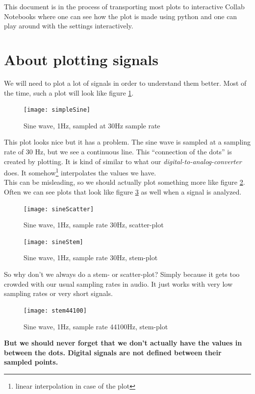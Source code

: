 This document is in the process of transporting most plots to interactive Collab Notebooks  where one can see how the plot is made using python and one can play around with the settings interactively.

\section{About plotting signals}

We will need to plot a lot of signals in order to understand them better. Most of the time, such a plot will look like figure \ref{fig:simpeSine}.

\begin{figure}[h!]
	\centering
	\texttt{[image: simpleSine]}
	\caption[simple sine plot]
	{Sine wave, 1Hz, sampled at 30Hz sample rate}
	\label{fig:simpeSine}
\end{figure}

This plot looks nice but it has a problem. The sine wave is sampled at a sampling rate of 30 Hz, but we see a continuous line. This ``connection of the dots'' is created by plotting. It is kind of similar to what our \textit{digital-to-analog-converter} does. It somehow\footnote{linear interpolation in case of the plot} interpolates the values we have. \\
This can be misleading, so we should actually plot something more like figure \ref{fig:scatter}. Often we can see plots that look like figure \ref{fig:stem} as well when a signal is analyzed.

\begin{figure}[H]
	\centering
	\texttt{[image: sineScatter]}
	\caption[Sine scatter-plot]
	{Sine wave, 1Hz, sample rate 30Hz, scatter-plot}
	\label{fig:scatter}
\end{figure}



\begin{figure}[H]
	\centering
	\texttt{[image: sineStem]}
	\caption[sine stem plot]
	{Sine wave, 1Hz, sample rate 30Hz, stem-plot}
	\label{fig:stem}
\end{figure}


So why don't we always do a stem- or scatter-plot? Simply because it gets too crowded with our usual sampling rates in audio. It just works with very low sampling rates or very short signals.\\
\begin{figure}[H]
	\centering
	\texttt{[image: stem44100]}
	\caption[sine stem plot, crowded]
	{Sine wave, 1Hz, sample rate 44100Hz, stem-plot}
	\label{fig:label}
\end{figure}
\textbf{But we should never forget that we don't actually have the values in between the dots. Digital signals are not defined between their sampled points.}

